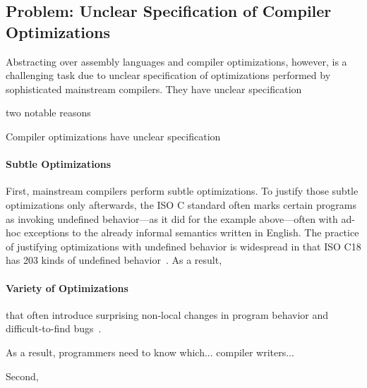 \subsection{Problem: Unclear Specification of Compiler Optimizations}
\label{sec:introduction:problem}

Abstracting over assembly languages and compiler optimizations, however, is a challenging task due
to unclear specification of optimizations performed by sophisticated mainstream compilers.  They
have unclear specification


 two notable reasons


Compiler
optimizations have unclear specification 

\paragraph{Subtle Optimizations}

First, mainstream compilers perform subtle optimizations.  To justify those subtle optimizations
only afterwards, the ISO C standard often marks certain programs as invoking undefined behavior---as
it did for the example above---often with ad-hoc exceptions to the already informal semantics
written in English.  The practice of justifying optimizations with undefined behavior is widespread
in that ISO C18 has 203 kinds of undefined behavior~\cite[J.2]{c18}.  As a result,


\paragraph{Variety of Optimizations}

that often introduce surprising non-local changes in program behavior and difficult-to-find
bugs~\cite{wang2013towards,yang2011finding}.


As a result, programmers need to know which... compiler writers...

Second, 






